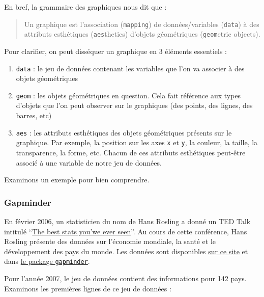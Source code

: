 \documentclass[a4paperpaper,]{article}
\providecommand{\tightlist}{%
  \setlength{\itemsep}{0pt}\setlength{\parskip}{0pt}}
\theoremstyle{definition}
\theoremstyle{definition}
\theoremstyle{definition}
\theoremstyle{remark}
\begin{document}
En bref, la grammaire des graphiques nous dit que :

\begin{quote}
Un graphique est l'association (\texttt{mapping}) de données/variables
(\texttt{data}) à des attributs esthétiques (\texttt{aes}thetics)
d'objets géométriques (\texttt{geom}etric objects).
\end{quote}

Pour clarifier, on peut disséquer un graphique en 3 éléments essentiels
:

\begin{enumerate}
\def\labelenumi{\arabic{enumi}.}
\tightlist
\item
  \texttt{data} : le jeu de données contenant les variables que l'on va
  associer à des objets géométriques
\item
  \texttt{geom} : les objets géométriques en question. Cela fait
  référence aux types d'objets que l'on peut observer sur le graphiques
  (des points, des lignes, des barres, etc)
\item
  \texttt{aes} : les attributs esthétiques des objets géométriques
  présents sur le graphique. Par exemple, la position sur les axes
  \texttt{x} et \texttt{y}, la couleur, la taille, la transparence, la
  forme, etc. Chacun de ces attributs esthétiques peut-être associé à
  une variable de notre jeu de données.
\end{enumerate}

Examinons un exemple pour bien comprendre.

\subsubsection{Gapminder}\label{gapminder}

En février 2006, un statisticien du nom de Hans Rosling a donné un TED
Talk intitulé
``\href{https://www.ted.com/talks/hans_rosling_shows_the_best_stats_you_ve_ever_seen}{The
best stats you'we ever seen}''. Au cours de cette conférence, Hans
Rosling présente des données sur l'économie mondiale, la santé et le
développement des pays du monde. Les données sont disponibles
\href{https://www.gapminder.org/tools/\#$chart-type=bubbles}{sur ce
site} et dans
\href{https://cran.r-project.org/web/packages/gapminder/index.html}{le
package \texttt{gapminder}}.

Pour l'année 2007, le jeu de données contient des informations pour 142
pays. Examinons les premières lignes de ce jeu de données :
\end{document}
